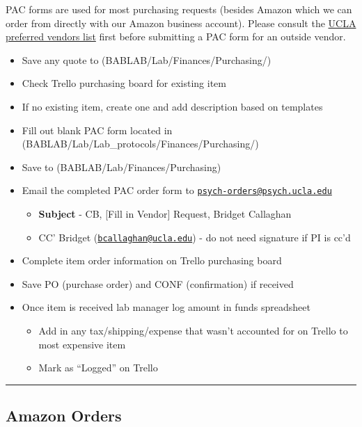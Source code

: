 \documentclass[]{book}
\providecommand{\tightlist}{%
  \setlength{\itemsep}{0pt}\setlength{\parskip}{0pt}}
\begin{document}
PAC forms are used for most purchasing requests (besides Amazon which we can order from directly with our Amazon business account). Please consult the \href{http://staff.purchasing.ucla.edu/Portal/app/agreements/agreementsummary.aspx}{UCLA preferred vendors list} first before submitting a PAC form for an outside vendor.

\begin{itemize}
\tightlist
\item
  Save any quote to (BABLAB/Lab/Finances/Purchasing/)
\item
  Check Trello purchasing board for existing item
\item
  If no existing item, create one and add description based on templates
\item
  Fill out blank PAC form located in (BABLAB/Lab/Lab\_protocols/Finances/Purchasing/)
\item
  Save to (BABLAB/Lab/Finances/Purchasing)
\item
  Email the completed PAC order form to \href{mailto:psych-orders@psych.ucla.edu}{\nolinkurl{psych-orders@psych.ucla.edu}}

  \begin{itemize}
  \tightlist
  \item
    \textbf{Subject} - CB, {[}Fill in Vendor{]} Request, Bridget Callaghan
  \item
    CC' Bridget (\href{mailto:bcallaghan@ucla.edu}{\nolinkurl{bcallaghan@ucla.edu}}) - do not need signature if PI is cc'd
  \end{itemize}
\item
  Complete item order information on Trello purchasing board
\item
  Save PO (purchase order) and CONF (confirmation) if received
\item
  Once item is received lab manager log amount in funds spreadsheet

  \begin{itemize}
  \tightlist
  \item
    Add in any tax/shipping/expense that wasn't accounted for on Trello to most expensive item
  \item
    Mark as ``Logged'' on Trello
  \end{itemize}
\end{itemize}

\begin{center}\rule{0.5\linewidth}{\linethickness}\end{center}

\hypertarget{amazon-orders}{%
\subsection{Amazon Orders}\label{amazon-orders}}
\end{document}
